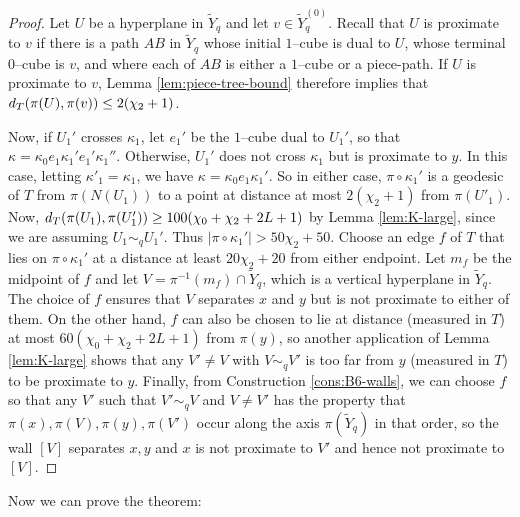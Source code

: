 \documentclass[11pt,oneside]{amsart}
\newcounter{ax}
\theoremstyle{definition}
\newcommand{\dist}{\textup{\textsf{d}}}
\begin{document}
\begin{proof}
Let $U$ be a hyperplane in $\widetilde Y_q$ and let $v\in\widetilde Y_q^{(0)}$.  Recall that $U$ is proximate to $v$ if there is a path $AB$ in $\widetilde Y_q$ whose initial $1$--cube is dual to $U$,  whose terminal $0$--cube is $v$, and where each of $AB$ is either a $1$--cube or a piece-path.  If $U$ is proximate to $v$, Lemma \ref{lem:piece-tree-bound} therefore implies that $\dist_T(\pi(U),\pi(v))\leq 2(\chi_2+1)$.

Now, if $U_1'$ crosses $\kappa_1$, let $e_1'$ be the $1$--cube dual to $U_1'$, so that $\kappa=\kappa_0e_1\kappa_1'e_1'\kappa_1''$.  Otherwise, $U_1'$ does not cross $\kappa_1$ but is proximate to $y$.  In this case, letting $\kappa'_1=\kappa_1$, we have $\kappa=\kappa_0e_1\kappa_1'$.  So in either case, $\pi\circ\kappa_1'$ is a geodesic of $T$ from $\pi(N(U_1))$ to a point at distance at most $2(\chi_2+1)$ from $\pi(U'_1)$.  Now, $\dist_T(\pi(U_1),\pi(U'_1))\geq 100(\chi_0+\chi_2+2L+1)$ by Lemma \ref{lem:K-large}, since we are assuming $U_1\sim_q U_1'$.  Thus $|\pi\circ\kappa_1'|>50\chi_2+50$.  Choose an edge $f$ of $T$ that lies on $\pi\circ\kappa_1'$ at a distance at least $20\chi_2+20$ from either endpoint.  Let $m_f$ be the midpoint of $f$ and let $V=\pi^{-1}(m_f)\cap\widetilde Y_q$, which is a vertical hyperplane in $\widetilde Y_q$.  The choice of $f$ ensures that $V$ separates $x$ and $y$ but is not proximate to either of them.  On the other hand, $f$ can also be chosen to lie at distance (measured in $T$) at most $60(\chi_0+\chi_2+2L+1)$ from $\pi(y)$, so another application of Lemma \ref{lem:K-large} shows that any $V'\neq V$ with $V\sim_qV'$ is too far from $y$ (measured in $T$) to be proximate to $y$.  Finally, from Construction \ref{cons:B6-walls}, we can choose $f$ so that any $V'$ such that $V'\sim_qV$ and $V\neq V'$ has the property that $\pi(x),\pi(V),\pi(y),\pi(V')$ occur along the axis $\pi(\widetilde Y_q)$ in that order, so the wall $[V]$ separates $x,y$ and $x$ is not proximate to $V'$ and hence not proximate to $[V]$.
\end{proof}

Now we can prove the theorem:
\end{document}
